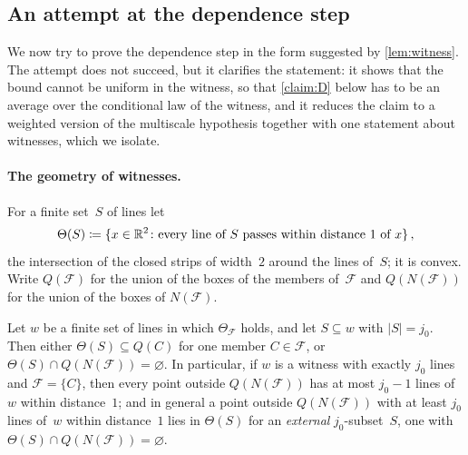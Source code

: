 \documentclass[11pt,letterpaper]{article}
\begin{document}
\subsection{An attempt at the dependence step}
\label{sec:attemptD}

We now try to prove the dependence step in the form suggested by \cref{lem:witness}. The attempt does not succeed, but it clarifies the statement: it shows that the bound cannot be uniform in the witness, so that \cref{claim:D} below has to be an average over the conditional law of the witness, and it reduces the claim to a weighted version of the multiscale hypothesis together with one statement about witnesses, which we isolate.

\paragraph{The geometry of witnesses.} For a finite set~$S$ of lines let
\begin{equation*}
  \Theta(S)\coloneqq\{x\in\mathbb R^2\colon\text{every line of }S\text{ passes within distance }1\text{ of }x\}\,,
\end{equation*}
the intersection of the closed strips of width~$2$ around the lines of~$S$; it is convex. Write $Q(\mathcal F)$ for the union of the boxes of the members of~$\mathcal F$ and $Q(N(\mathcal F))$ for the union of the boxes of $N(\mathcal F)$.

\begin{lemma}
\label{lem:dichotomy}
Let $w$ be a finite set of lines in which $\Theta_{\mathcal F}$ holds, and let $S\subseteq w$ with $\lvert S\rvert=j_0$. Then either $\Theta(S)\subseteq Q(C)$ for one member $C\in\mathcal F$, or $\Theta(S)\cap Q(N(\mathcal F))=\varnothing$. In particular, if $w$ is a witness with exactly $j_0$ lines and $\mathcal F=\{C\}$, then every point outside $Q(N(\mathcal F))$ has at most $j_0-1$ lines of~$w$ within distance~$1$; and in general a point outside $Q(N(\mathcal F))$ with at least $j_0$ lines of~$w$ within distance~$1$ lies in $\Theta(S)$ for an \emph{external} $j_0$-subset~$S$, one with $\Theta(S)\cap Q(N(\mathcal F))=\varnothing$.
\end{lemma}
\end{document}
